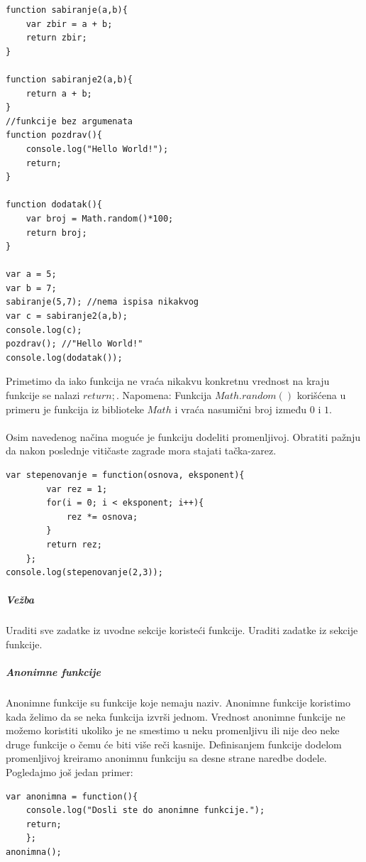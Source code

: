 \documentclass[a4paper]{article}
\begin{document}
\begin{lstlisting}[backgroundcolor = \color{lightgray}]
function sabiranje(a,b){
	var zbir = a + b;
	return zbir;
}

function sabiranje2(a,b){
	return a + b;
}
//funkcije bez argumenata
function pozdrav(){
	console.log("Hello World!");
	return;
}

function dodatak(){
	var broj = Math.random()*100;
	return broj;
}

var a = 5;
var b = 7;
sabiranje(5,7); //nema ispisa nikakvog
var c = sabiranje2(a,b); 
console.log(c);
pozdrav(); //"Hello World!"
console.log(dodatak());
\end{lstlisting}
Primetimo da iako funkcija ne vraća nikakvu konkretnu vrednost na kraju funkcije se nalazi $return;$.
Napomena: Funkcija $Math.random()$ korišćena u primeru je funkcija iz biblioteke $Math$ i vraća nasumični broj između $0$ i $1$. \\\\

Osim navedenog načina moguće je funkciju dodeliti promenljivoj. Obratiti pažnju da nakon poslednje vitičaste zagrade mora stajati tačka-zarez. 
\begin{lstlisting}[backgroundcolor = \color{lightgray}]
var stepenovanje = function(osnova, eksponent){
		var rez = 1;
        for(i = 0; i < eksponent; i++){
        	rez *= osnova;
        }
        return rez;
	};
console.log(stepenovanje(2,3));
\end{lstlisting}


\subparagraph{Vežba}
Uraditi sve zadatke iz uvodne sekcije koristeći funkcije. Uraditi zadatke iz sekcije funkcije.

\subparagraph{Anonimne funkcije}
Anonimne funkcije su funkcije koje nemaju naziv. Anonimne funkcije koristimo kada želimo da se neka funkcija izvrši jednom. Vrednost anonimne funkcije ne možemo koristiti ukoliko je ne smestimo u neku promenljivu ili nije deo neke druge funkcije o čemu će biti više reči kasnije. Definisanjem funkcije dodelom promenljivoj kreiramo anonimnu funkciju sa desne strane naredbe dodele. Pogledajmo još jedan primer:
\begin{lstlisting}[backgroundcolor = \color{lightgray}]
var anonimna = function(){
	console.log("Dosli ste do anonimne funkcije.");
	return;
	};
anonimna();
\end{lstlisting}
\end{document}
